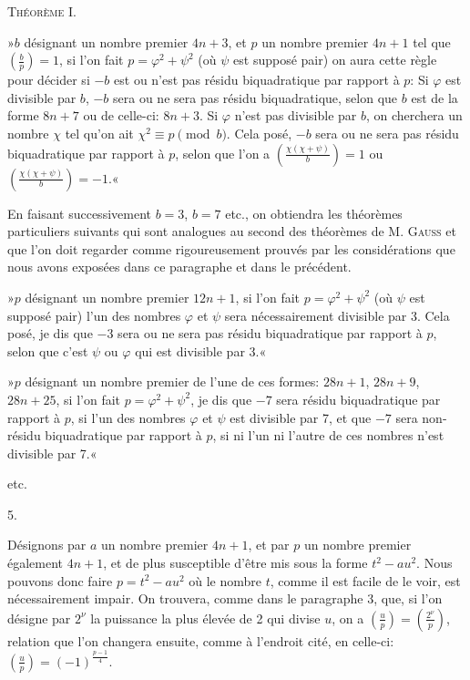 \documentclass[11pt]{article}
\newcommand{\leg}[2]{\left(\frac{#1}{#2}\right)}
\newcommand{\unitid}[1]{\hypertarget{#1}{}}
\begin{document}
\begin{center}
\unitid{dirichlet.v1.p04b.thm.001}\textsc{Théorème I.}
\end{center}

\unitid{dirichlet.v1.p04b.par.015}»$b$ désignant un nombre premier $4n+3$, et $p$ un nombre premier $4n+1$ tel que $\leg{b}{p}=1$, si l'on fait $p=\varphi^2+\psi^2$ (où $\psi$ est supposé pair) on aura cette règle pour décider si $-b$ est ou n'est pas résidu biquadratique par rapport à $p$: Si $\varphi$ est divisible par $b$, $-b$ sera ou ne sera pas résidu biquadratique, selon que $b$ est de la forme $8n+7$ ou de celle-ci: $8n+3$. Si $\varphi$ n'est pas divisible par $b$, on cherchera un nombre $\chi$ tel qu'on ait $\chi^2\equiv p\pmod b$. Cela posé, $-b$ sera ou ne sera pas résidu biquadratique par rapport à $p$, selon que l'on a $\leg{\chi(\chi+\psi)}{b}=1$ ou $\leg{\chi(\chi+\psi)}{b}=-1$.«

\unitid{dirichlet.v1.p04b.par.016}En faisant successivement $b=3$, $b=7$ etc., on obtiendra les théorèmes particuliers suivants qui sont analogues au second des théorèmes de M. \textsc{Gauss} et que l'on doit regarder comme rigoureusement prouvés par les considérations que nous avons exposées dans ce paragraphe et dans le précédent.

\unitid{dirichlet.v1.p04b.par.017}»$p$ désignant un nombre premier $12n+1$, si l'on fait $p=\varphi^2+\psi^2$ (où $\psi$ est supposé pair) l'un des nombres $\varphi$ et $\psi$ sera nécessairement divisible par 3. Cela posé, je dis que $-3$ sera ou ne sera pas résidu biquadratique par rapport à $p$, selon que c'est $\psi$ ou $\varphi$ qui est divisible par 3.«

\unitid{dirichlet.v1.p04b.par.018}»$p$ désignant un nombre premier de l'une de ces formes: $28n+1$, $28n+9$, $28n+25$, si l'on fait $p=\varphi^2+\psi^2$, je dis que $-7$ sera résidu biquadratique par rapport à $p$, si l'un des nombres $\varphi$ et $\psi$ est divisible par 7, et que $-7$ sera non-résidu biquadratique par rapport à $p$, si ni l'un ni l'autre de ces nombres n'est divisible par 7.«

\unitid{dirichlet.v1.p04b.par.019}etc.

\begin{center}
\unitid{dirichlet.v1.p04b.sec.005}5.
\end{center}

\unitid{dirichlet.v1.p04b.par.020}Désignons par $a$ un nombre premier $4n+1$, et par $p$ un nombre premier également $4n+1$, et de plus susceptible d'être mis sous la forme $t^2-au^2$. Nous pouvons donc faire $p=t^2-au^2$ où le nombre $t$, comme il est facile de le voir, est nécessairement impair. On trouvera, comme dans le paragraphe 3, que, si l'on désigne par $2^\nu$ la puissance la plus élevée de 2 qui divise $u$, on a $\leg{u}{p}=\leg{2^\nu}{p}$, relation que l'on changera ensuite, comme à l'endroit cité, en celle-ci: $\leg{u}{p}=(-1)^{\frac{p-1}{4}}$.
\end{document}
